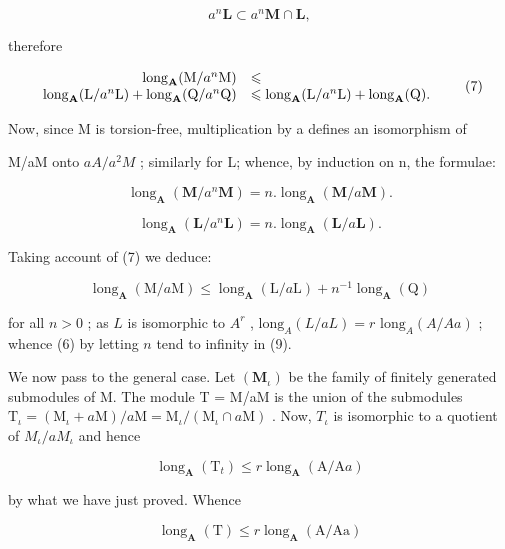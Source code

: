 \[
a ^ {n} \mathbf {L} \subset a ^ {n} \mathbf {M} \cap \mathbf {L},
\]

therefore

\[
\begin{array}{r l} \operatorname{long} _ {\mathbf {A}} (\mathrm{M} / a ^ {n} \mathrm{M}) & \leqslant \\ \operatorname{long} _ {\mathbf {A}} (\mathrm{L} / a ^ {n} \mathrm{L}) + \operatorname{long} _ {\mathbf {A}} (\mathrm{Q} / a ^ {n} \mathrm{Q}) & \leqslant \operatorname{long} _ {\mathbf {A}} (\mathrm{L} / a ^ {n} \mathrm{L}) + \operatorname{long} _ {\mathbf {A}} (\mathrm{Q}). \end{array} \tag {7}
\]

Now, since M is torsion-free, multiplication by a defines an isomorphism of

M/aM onto \(aA/a^{2}M\) ; similarly for L; whence, by induction on n, the formulae:

\[
\operatorname{long} _ {\mathbf {A}} (\mathbf {M} / a ^ {n} \mathbf {M}) = n. \operatorname{long} _ {\mathbf {A}} (\mathbf {M} / a \mathbf {M}).\tag{8}
\]

\[
\operatorname{long} _ {\mathbf {A}} (\mathbf {L} / a ^ {n} \mathbf {L}) = n. \operatorname{long} _ {\mathbf {A}} (\mathbf {L} / a \mathbf {L}).
\]

Taking account of (7) we deduce:

\[
\operatorname{long} _ {\mathbf {A}} (\mathrm{M} / a \mathrm{M}) \leqslant \operatorname{long} _ {\mathbf {A}} (\mathrm{L} / a \mathrm{L}) + n ^ {- 1} \operatorname{long} _ {\mathbf {A}} (\mathrm{Q})\tag{9}
\]

for all \(n > 0\) ; as \(L\) is isomorphic to \(A^r\) , \(\text{long}_A(L/aL) = r \text{ long}_A(A/Aa)\) ; whence (6) by letting \(n\) tend to infinity in (9).

We now pass to the general case. Let \((\mathbf{M}_{\iota})\) be the family of finitely generated submodules of M. The module T = M/aM is the union of the submodules \(\mathrm{T}_{\iota} = (\mathrm{M}_{\iota} + a\mathrm{M})/a\mathrm{M} = \mathrm{M}_{\iota}/(\mathrm{M}_{\iota} \cap a\mathrm{M})\) . Now, \(T_{\iota}\) is isomorphic to a quotient of \(M_{\iota}/aM_{\iota}\) and hence

\[
\operatorname{long} _ {\mathbf {A}} \left(\mathrm{T} _ {t}\right) \leqslant r \operatorname{long} _ {\mathbf {A}} (\mathrm{A} / \mathrm{A} a)
\]

by what we have just proved. Whence

\[
\operatorname{long} _ {\mathbf {A}} (\mathrm{T}) \leqslant r \operatorname{long} _ {\mathbf {A}} (\mathrm{A/Aa})
\]

